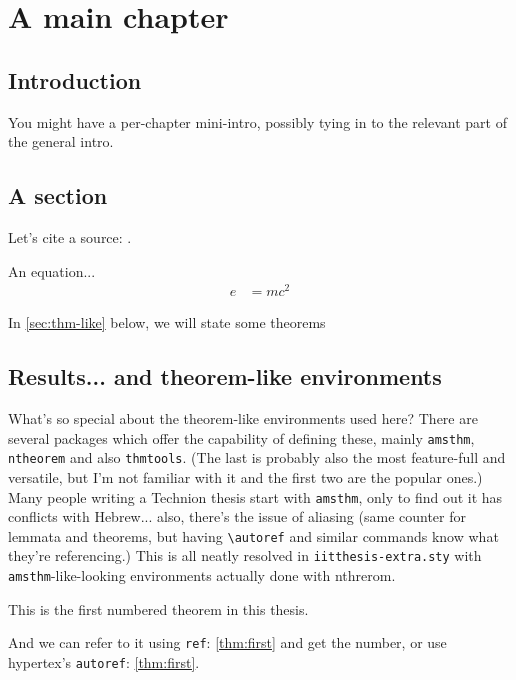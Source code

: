 \chapter{A main chapter}
\label{chap:firstchap}

\section{Introduction}

You might have a per-chapter mini-intro, possibly tying in to the relevant part of the general intro.

\section{A section}

\lipsum[1]

Let's cite a source: \cite{Yao1977}.

An equation...
\begin{align}
\label{eq:emc2}
e &= mc^2
\end{align}

In \autoref{sec:thm-like} below, we will state some theorems

\section{Results... and theorem-like environments}
\label{sec:thm-like}

What's so special about the theorem-like environments used here? There are several packages which offer the capability of defining these, mainly \texttt{amsthm}, \texttt{ntheorem} and also \texttt{thmtools}. (The last is probably also the most feature-full and versatile, but I'm not familiar with it and the first two are the popular ones.) Many people writing a Technion thesis start with \texttt{amsthm}, only to find out it has conflicts with Hebrew... also, there's the issue of aliasing (same counter for lemmata and theorems, but having \texttt{{\textbackslash}autoref} and similar commands know what they're referencing.) This is all neatly resolved in \texttt{iitthesis-extra.sty} with \texttt{amsthm}-like-looking environments actually done with nthrerom.

\begin{theorem}
\label{thm:first}
This is the first numbered theorem in this thesis.
\end{theorem}

And we can refer to it using \texttt{ref}: \ref{thm:first} and get the number, or use hypertex's \texttt{autoref}: \autoref{thm:first}.

